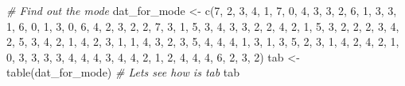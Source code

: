 \documentclass[
]{book}
\newenvironment{Shaded}{\begin{snugshade}}{\end{snugshade}}
\newcommand{\CommentTok}[1]{\textcolor[rgb]{0.56,0.35,0.01}{\textit{#1}}}
\newcommand{\DecValTok}[1]{\textcolor[rgb]{0.00,0.00,0.81}{#1}}
\newcommand{\FunctionTok}[1]{\textcolor[rgb]{0.00,0.00,0.00}{#1}}
\newcommand{\NormalTok}[1]{#1}
\newcommand{\OtherTok}[1]{\textcolor[rgb]{0.56,0.35,0.01}{#1}}
\begin{document}
\begin{Shaded}
\begin{Highlighting}[]
\CommentTok{\# Find out the mode}
\NormalTok{dat\_for\_mode }\OtherTok{\textless{}{-}} \FunctionTok{c}\NormalTok{(}\DecValTok{7}\NormalTok{, }\DecValTok{2}\NormalTok{, }\DecValTok{3}\NormalTok{, }\DecValTok{4}\NormalTok{, }\DecValTok{1}\NormalTok{, }\DecValTok{7}\NormalTok{, }\DecValTok{0}\NormalTok{, }\DecValTok{4}\NormalTok{, }\DecValTok{3}\NormalTok{, }\DecValTok{3}\NormalTok{, }\DecValTok{2}\NormalTok{, }\DecValTok{6}\NormalTok{, }\DecValTok{1}\NormalTok{, }\DecValTok{3}\NormalTok{, }\DecValTok{3}\NormalTok{, }\DecValTok{1}\NormalTok{, }\DecValTok{6}\NormalTok{, }\DecValTok{0}\NormalTok{, }\DecValTok{1}\NormalTok{, }\DecValTok{3}\NormalTok{, }
                  \DecValTok{0}\NormalTok{, }\DecValTok{6}\NormalTok{, }\DecValTok{4}\NormalTok{, }\DecValTok{2}\NormalTok{, }\DecValTok{3}\NormalTok{, }\DecValTok{2}\NormalTok{, }\DecValTok{2}\NormalTok{, }\DecValTok{7}\NormalTok{, }\DecValTok{3}\NormalTok{, }\DecValTok{1}\NormalTok{, }\DecValTok{5}\NormalTok{, }\DecValTok{3}\NormalTok{, }\DecValTok{4}\NormalTok{, }\DecValTok{3}\NormalTok{, }\DecValTok{3}\NormalTok{, }\DecValTok{2}\NormalTok{, }\DecValTok{2}\NormalTok{, }\DecValTok{4}\NormalTok{, }\DecValTok{2}\NormalTok{, }\DecValTok{1}\NormalTok{, }
                  \DecValTok{5}\NormalTok{, }\DecValTok{3}\NormalTok{, }\DecValTok{2}\NormalTok{, }\DecValTok{2}\NormalTok{, }\DecValTok{2}\NormalTok{, }\DecValTok{3}\NormalTok{, }\DecValTok{4}\NormalTok{, }\DecValTok{2}\NormalTok{, }\DecValTok{5}\NormalTok{, }\DecValTok{3}\NormalTok{, }\DecValTok{4}\NormalTok{, }\DecValTok{2}\NormalTok{, }\DecValTok{1}\NormalTok{, }\DecValTok{4}\NormalTok{, }\DecValTok{2}\NormalTok{, }\DecValTok{3}\NormalTok{, }\DecValTok{1}\NormalTok{, }\DecValTok{1}\NormalTok{, }\DecValTok{4}\NormalTok{, }\DecValTok{3}\NormalTok{, }
                  \DecValTok{2}\NormalTok{, }\DecValTok{3}\NormalTok{, }\DecValTok{5}\NormalTok{, }\DecValTok{4}\NormalTok{, }\DecValTok{4}\NormalTok{, }\DecValTok{4}\NormalTok{, }\DecValTok{1}\NormalTok{, }\DecValTok{3}\NormalTok{, }\DecValTok{1}\NormalTok{, }\DecValTok{3}\NormalTok{, }\DecValTok{5}\NormalTok{, }\DecValTok{2}\NormalTok{, }\DecValTok{3}\NormalTok{, }\DecValTok{1}\NormalTok{, }\DecValTok{4}\NormalTok{, }\DecValTok{2}\NormalTok{, }\DecValTok{4}\NormalTok{, }\DecValTok{2}\NormalTok{, }\DecValTok{1}\NormalTok{, }\DecValTok{0}\NormalTok{, }
                  \DecValTok{3}\NormalTok{, }\DecValTok{3}\NormalTok{, }\DecValTok{3}\NormalTok{, }\DecValTok{3}\NormalTok{, }\DecValTok{4}\NormalTok{, }\DecValTok{4}\NormalTok{, }\DecValTok{4}\NormalTok{, }\DecValTok{3}\NormalTok{, }\DecValTok{4}\NormalTok{, }\DecValTok{4}\NormalTok{, }\DecValTok{2}\NormalTok{, }\DecValTok{1}\NormalTok{, }\DecValTok{2}\NormalTok{, }\DecValTok{4}\NormalTok{, }\DecValTok{4}\NormalTok{, }\DecValTok{4}\NormalTok{, }\DecValTok{6}\NormalTok{, }\DecValTok{2}\NormalTok{, }\DecValTok{3}\NormalTok{, }\DecValTok{2}\NormalTok{)}
\NormalTok{tab }\OtherTok{\textless{}{-}} \FunctionTok{table}\NormalTok{(dat\_for\_mode)}
\CommentTok{\# Let\textquotesingle{}s see how is tab}
\NormalTok{tab}
\end{Highlighting}
\end{Shaded}
\end{document}
